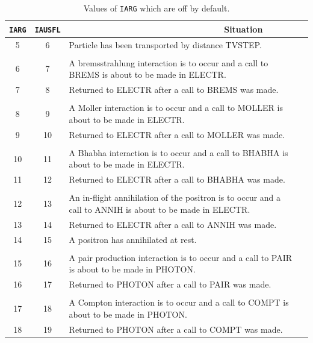  
 
    \begin{table}[htbp]
 
    \begin{center}
    \caption{Values of {\tt IARG} which are off by default.}
    \label{tab_iausflg_other}
     \vspace*{2mm}
    \begin{tabular}{ c c   p{125mm}l }
    \hline
    {\tt IARG} & {\tt IAUSFL} & ~~~~~~~~~~~~~~~~~~~~~~~~~~~~~~~~Situation \\
    \hline
5&6&  Particle has been transported by distance TVSTEP.\\
&&\\
6&7& A bremsstrahlung interaction is to occur and a call
             to BREMS is about to be made in ELECTR.\\
7&8& Returned to ELECTR after a call to BREMS was made.\\
&&\\
8&9& A Moller interaction is to occur and a call to
             MOLLER is about to be made in ELECTR.\\
9&10& Returned to ELECTR after a call to MOLLER was made.\\
&&\\
10&11&  A Bhabha interaction is to occur and a call to
             BHABHA is about to be made in ELECTR.\\
11&12& Returned to ELECTR after a call to BHABHA was made.\\
&&\\
12&13& An in-flight annihilation of the positron is to
             occur and a call to ANNIH is about to be made
             in ELECTR.\\
13&14& Returned to ELECTR after a call to ANNIH was made.\\
14&15&  A positron has annihilated at rest.\\
&&\\
15&16& A pair production interaction is to occur and a
             call to PAIR is about to be made in PHOTON.\\
16&17& Returned to PHOTON after a call to PAIR was made.\\
&&\\
17&18& A Compton interaction is to occur and a call to
             COMPT is about to be made in PHOTON.\\
18&19& Returned to PHOTON after a call to COMPT was made.\\

\end{tabular}
\end{center}
\end{table}
